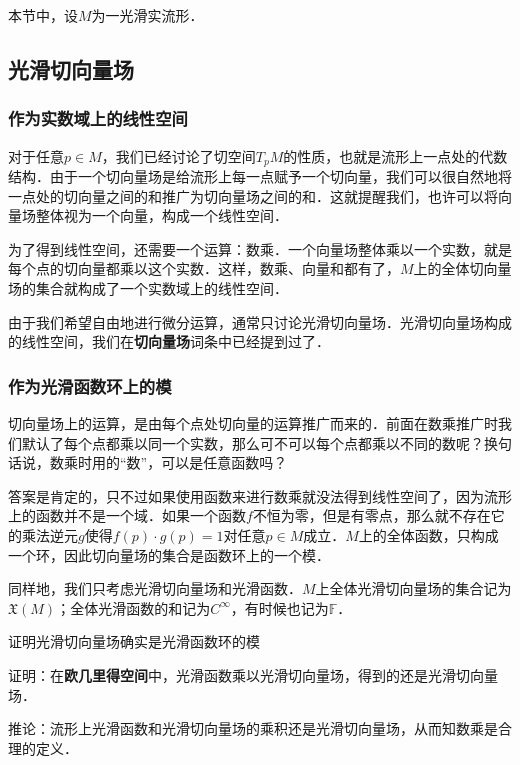 

本节中，设$M$为一光滑实流形．

\subsection{光滑切向量场}

\subsubsection{作为实数域上的线性空间}

对于任意$p\in M$，我们已经讨论了切空间$T_pM$的性质，也就是流形上一点处的代数结构．由于一个切向量场是给流形上每一点赋予一个切向量，我们可以很自然地将一点处的切向量之间的和推广为切向量场之间的和．这就提醒我们，也许可以将向量场整体视为一个向量，构成一个线性空间．

为了得到线性空间，还需要一个运算：数乘．一个向量场整体乘以一个实数，就是每个点的切向量都乘以这个实数．这样，数乘、向量和都有了，$M$上的全体切向量场的集合就构成了一个实数域上的线性空间．

由于我们希望自由地进行微分运算，通常只讨论光滑切向量场．光滑切向量场构成的线性空间，我们在\textbf{切向量场}词条中已经提到过了．

\subsubsection{作为光滑函数环上的模}

切向量场上的运算，是由每个点处切向量的运算推广而来的．前面在数乘推广时我们默认了每个点都乘以同一个实数，那么可不可以每个点都乘以不同的数呢？换句话说，数乘时用的“数”，可以是任意函数吗？

答案是肯定的，只不过如果使用函数来进行数乘就没法得到线性空间了，因为流形上的函数并不是一个域．如果一个函数$f$不恒为零，但是有零点，那么就不存在它的乘法逆元$g$使得$f(p)\cdot g(p)=1$对任意$p\in M$成立．$M$上的全体函数，只构成一个环，因此切向量场的集合是函数环上的一个模．

同样地，我们只考虑光滑切向量场和光滑函数．$M$上全体光滑切向量场的集合记为$\mathfrak{X}(M)$；全体光滑函数的和记为$C^{\infty}$，有时候也记为$\mathbb{F}$．

\begin{exercise}{证明光滑切向量场确实是光滑函数环的模}

证明：在\textbf{欧几里得空间}中，光滑函数乘以光滑切向量场，得到的还是光滑切向量场．

推论：流形上光滑函数和光滑切向量场的乘积还是光滑切向量场，从而知数乘是合理的定义．

\end{exercise}


